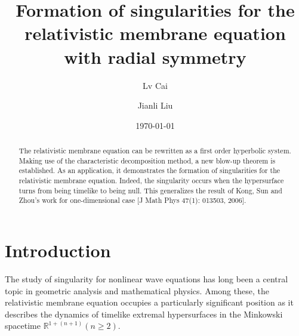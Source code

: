 \documentclass[10pt,leqno]{amsart}
\numberwithin{equation}{section}
\begin{document}
\title{Formation of singularities for the relativistic membrane equation with radial symmetry} %


\author[author1]{Lv Cai}
\author[author2]{Jianli Liu}
\date{\today}
\address{Department of Mathematics, Shanghai University, 99 Shangda Road, Shanghai, 200444, China}
\maketitle

\let\thefootnote\relax
{} %



\begin{abstract}
The relativistic membrane equation can be rewritten as a first order hyperbolic system. 
Making use of the characteristic decomposition method, a new blow-up theorem is established. As an application, it demonstrates the formation of singularities for the relativistic membrane equation. Indeed, the singularity occurs when the hypersurface turns from being timelike to being null. This generalizes the result of Kong, Sun and Zhou's work for one-dimensional case [J Math Phys 47(1): 013503, 2006].

\end{abstract} %




\bigskip

\section{Introduction}
\par


The study of singularity for nonlinear wave equations has long been a central topic in geometric analysis and mathematical physics. Among these, the relativistic membrane equation occupies a particularly significant position as it describes the dynamics of timelike extremal hypersurfaces in the Minkowski spacetime $\mathbb{R}^{1+(n+1)} (n \geq 2)$. 
\end{document}
